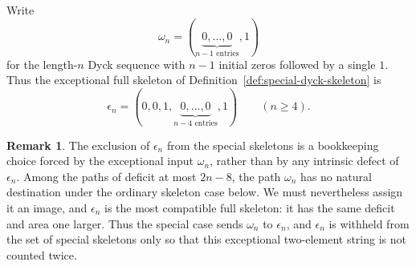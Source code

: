 \documentclass[11pt]{article}
\theoremstyle{plain}
\theoremstyle{definition}
\newtheorem{remark}[theorem]{Remark}
\theoremstyle{remark}
\begin{document}
Write
\[
  \omega_n=(\underbrace{0,\ldots,0}_{n-1\text{ entries}},1)
\]
for the length-\(n\) Dyck sequence with \(n-1\) initial zeros followed by a
single \(1\).  Thus the exceptional full skeleton of
Definition~\ref{def:special-dyck-skeleton} is
\[
  \epsilon_n=(0,0,1,\underbrace{0,\ldots,0}_{n-4\text{ entries}},1)
  \qquad (n\ge 4).
\]

\begin{remark}
The exclusion of \(\epsilon_n\) from the special skeletons is a bookkeeping
choice forced by the exceptional input \(\omega_n\), rather than by any
intrinsic defect of \(\epsilon_n\).  Among the paths of deficit at most
\(2n-8\), the path \(\omega_n\) has no natural destination under the ordinary
skeleton case below.  We must nevertheless assign it an image, and
\(\epsilon_n\) is the most compatible full skeleton: it has the same deficit
and area one larger.  Thus the special case sends \(\omega_n\) to
\(\epsilon_n\), and \(\epsilon_n\) is withheld from the set of special
skeletons only so that this exceptional two-element string is not counted
twice.
\end{remark}
\end{document}
